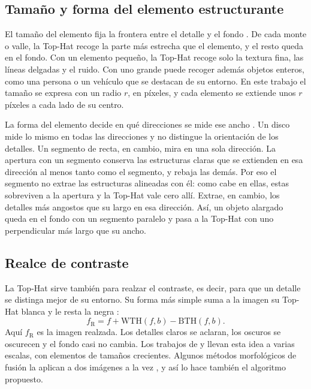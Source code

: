 \subsection{Tamaño y forma del elemento estructurante}

El tamaño del elemento fija la frontera entre el detalle y el fondo \parencite{soille2003, gonzalez2018}.
De cada monte o valle, la Top-Hat recoge la parte más estrecha que el elemento, y el resto queda en el
fondo. Con un elemento pequeño, la Top-Hat recoge solo la textura fina, las líneas delgadas y el ruido.
Con uno grande puede recoger además objetos enteros, como una persona o un vehículo que se destacan de su
entorno. En este trabajo el tamaño se expresa con un radio $r$, en píxeles, y cada elemento se extiende
unos $r$ píxeles a cada lado de su centro.

La forma del elemento decide en qué direcciones se mide ese ancho \parencite{serra1982, soille2003}. Un
disco mide lo mismo en todas las direcciones y no distingue la orientación de los detalles. Un segmento
de recta, en cambio, mira en una sola dirección. La apertura con un segmento conserva las estructuras
claras que se extienden en esa dirección al menos tanto como el segmento, y rebaja las demás. Por eso el
segmento no extrae las estructuras alineadas con él: como cabe en ellas, estas sobreviven a la apertura y
la Top-Hat vale cero allí. Extrae, en cambio, los detalles más angostos que su largo en esa dirección.
Así, un objeto alargado queda en el fondo con un segmento paralelo y pasa a la Top-Hat con uno
perpendicular más largo que su ancho.

\subsection{Realce de contraste}

La Top-Hat sirve también para realzar el contraste, es decir, para que un detalle se distinga mejor de
su entorno. Su forma más simple suma a la imagen su Top-Hat blanca y le resta la negra
\parencite{bai2012}:
\begin{equation} f_{\mathrm{R}} = f + \mathrm{WTH}(f,b) - \mathrm{BTH}(f,b). \label{eq:realce} \end{equation}
Aquí $f_{\mathrm{R}}$ es la imagen realzada. Los detalles claros se aclaran, los oscuros se oscurecen y
el fondo casi no cambia. Los trabajos de \textcite{mukhopadhyay2000} y \textcite{bai2012} llevan esta
idea a varias escalas, con elementos de tamaños crecientes. Algunos métodos morfológicos de fusión la
aplican a dos imágenes a la vez \parencite{bai2013, roman2020}, y así lo hace también el algoritmo
propuesto.

